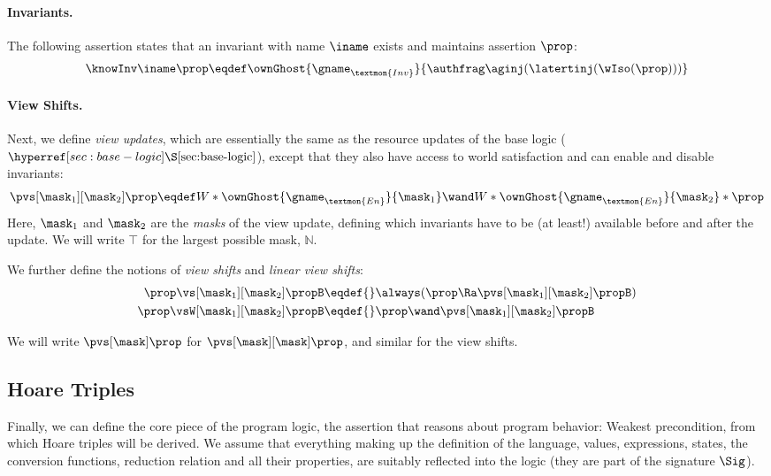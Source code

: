 \paragraph{Invariants.}
The following assertion states that an invariant with name $\iname$ exists and maintains assertion $\prop$:
\[ \knowInv\iname\prop \eqdef \ownGhost{\gname_{\textmon{Inv}}}{\authfrag \aginj(\latertinj(\wIso(\prop)))} \]

\paragraph{View Shifts.}
Next, we define \emph{view updates}, which are essentially the same as the resource updates of the base logic ($\Sref{sec:base-logic}$), except that they also have access to world satisfaction and can enable and disable invariants:
\[ \pvs[\mask_1][\mask_2] \prop \eqdef W * \ownGhost{\gname_{\textmon{En}}}{\mask_1} \wand W * \ownGhost{\gname_{\textmon{En}}}{\mask_2} * \prop \]
Here, $\mask_1$ and $\mask_2$ are the \emph{masks} of the view update, defining which invariants have to be (at least!) available before and after the update.
We will write $\top$ for the largest possible mask, $\mathbb N$.

We further define the notions of \emph{view shifts} and \emph{linear view shifts}:
\begin{align*}
  \prop \vs[\mask_1][\mask_2] \propB \eqdef{}& \always(\prop \Ra \pvs[\mask_1][\mask_2] \propB) \\
  \prop \vsW[\mask_1][\mask_2] \propB \eqdef{}& \prop \wand \pvs[\mask_1][\mask_2] \propB
\end{align*}

We will write $\pvs[\mask] \prop$ for $\pvs[\mask][\mask]\prop$, and similar for the view shifts.


\subsection{Hoare Triples}

Finally, we can define the core piece of the program logic, the assertion that reasons about program behavior: Weakest precondition, from which Hoare triples will be derived.
We assume that everything making up the definition of the language, \ie values, expressions, states, the conversion functions, reduction relation and all their properties, are suitably reflected into the logic (\ie they are part of the signature $\Sig$).

